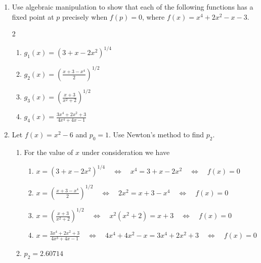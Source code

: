 \begin{myexercise}\label{Comprehensionquiz2}
\begin{enumerate}[label=\arabic*.]
\item Use algebraic manipulation to show that each of the following functions has a fixed point at $p$ precisely
 when $f(p) = 0$, where $f(x) = x^4 +2x^2-x-3$.
\begin{multicols}{2}
\begin{enumerate}[label=(\alph*)]
\item $g_1(x)=(3+x-2x^2)^{1/4}$\\[5mm]
\item $g_2(x)=\left(\frac{x+3-x^4}{2}\right)^{1/2}$
\item $g_3(x)=\left(\frac{x+3}{x^2+2}\right)^{1/2}$\\[4mm]
\item $g_4(x)=\frac{3x^4+2x^2+3}{4x^4+4x-1}$
\end{enumerate}
\end{multicols}
\item Let $f(x)=x^2−6$ and $p_0=1$. Use Newton’s method to find $p_2$.
\begin{mysolution}
\begin{enumerate}[label=(\alph*)]
\item For the value of $x$ under consideration we have
\begin{enumerate}[label=\arabic*.]
\item $x =(3+x-2x^2)^{1/4}\quad\Leftrightarrow\quad x^4 = 3+x-2x^2\quad\Leftrightarrow\quad f(x) = 0$\\
\item $x =\left(\frac{x+3-x^4}{2}\right)^{1/2}\quad\Leftrightarrow\quad 2x^2 = x+3-x^4\quad\Leftrightarrow\quad f(x) = 0$\\
\item $x =\left(\frac{x+3}{x^2+2}\right)^{1/2}\quad\Leftrightarrow\quad x^2(x^2+2)= x+3\quad\Leftrightarrow\quad f(x) = 0$\\
\item $x =\frac{3x^4+2x^2+3}{4x^3+4x-1}\quad\Leftrightarrow\quad 4x^4+4x^2-x= 3x^4+2x^2+3\quad\Leftrightarrow\quad f(x) = 0$
\end{enumerate}
\item $p_2=2.60714$
\end{enumerate}
\end{mysolution}
\end{enumerate}
\end{myexercise}






